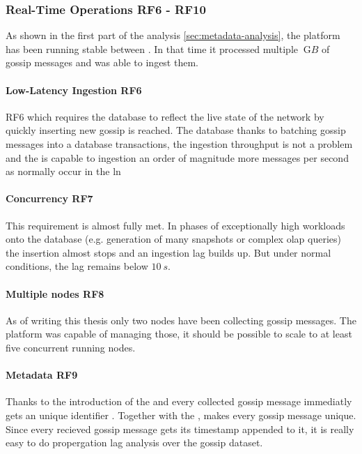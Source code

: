 \subsubsection{Real-Time Operations RF6 - RF10}
As shown in the first part of the analysis \autoref{sec:metadata-analysis},
the  platform has been running stable between  
.
In that time it processed multiple $\qty{}{\giga B}$ of gossip messages and
was able to ingest them.


\paragraph{Low-Latency Ingestion RF6}
RF6 which requires the database to reflect the live state of the network
by quickly inserting new gossip is reached.
The database thanks to batching gossip messages into a database transactions,
the ingestion throughput is not a problem and the 
is capable to ingestion an order of magnitude more messages per second as normally
occur in the \gls{ln}

\paragraph{Concurrency RF7}
This requirement is almost fully met. In phases of exceptionally high workloads
onto the database (e.g. generation of many snapshots or complex \gls{olap} queries)
the insertion almost stops and an ingestion lag builds up.
But under normal conditions, the lag remains below $\qty{10}{s}$.

\paragraph{Multiple nodes RF8}
As of writing this thesis only two nodes have been collecting gossip messages.
The platform was capable of managing those, it should be possible to scale to at least
five concurrent running nodes.

\paragraph{Metadata RF9}
Thanks to the introduction of the  and 
every collected gossip message immediatly gets an unique identifier .
Together with the , makes every gossip message unique.
Since every recieved gossip message gets its timestamp appended to it, it is really
easy to do propergation lag analysis over the gossip dataset. 


